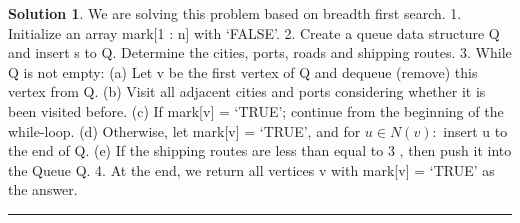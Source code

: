 \documentclass{article}
\theoremstyle{definition}
\def\fline{\rule{0.75\linewidth}{0.5pt}}
\newcommand{\finishline}{\begin{center}\fline\end{center}}
\newtheorem*{solution*}{Solution}
\newenvironment{solution}{\begin{solution*}}{{\finishline} \end{solution*}}
\begin{document}
\begin{solution}

We are solving this problem based on breadth first search. 1. Initialize an array mark[1 : n] with ‘FALSE’. 
	2. Create a queue data structure Q and insert s to Q. Determine the cities, ports, roads and shipping routes.
	3. While Q is not empty: (a) Let v be the first vertex of Q and dequeue (remove) this vertex from Q. (b) Visit all adjacent cities and ports considering whether it is been visited before. (c) If mark[v] = ‘TRUE’; continue from the beginning of the while-loop. (d) Otherwise, let mark[v] = ‘TRUE’, and for $u \in N(v):$ insert u to the end of Q. (e) If the shipping routes are less than equal to 3 , then push it into the Queue Q.
	4. At the end, we return all vertices v with mark[v] = ‘TRUE’ as the answer. \\

\end{solution}
\end{document}
